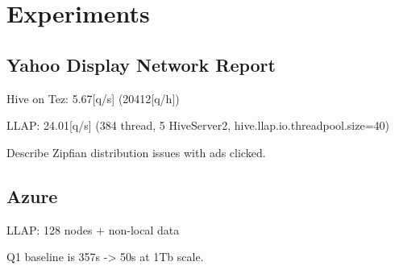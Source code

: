 \section{Experiments}


\subsection{Yahoo Display Network Report}

Hive on Tez: 5.67[q/s] (20412[q/h])

LLAP: 24.01[q/s] (384 thread, 5 HiveServer2, hive.llap.io.threadpool.size=40)

Describe Zipfian distribution issues with ads clicked.

\subsection{Azure}

LLAP: 128 nodes + non-local data

Q1 baseline is 357s -> 50s at 1Tb scale.


